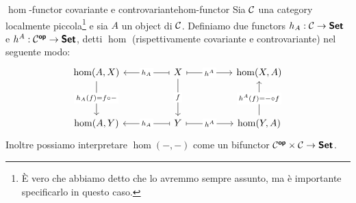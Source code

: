 \documentclass{article}
\renewcommand\C{\mc{C}}
\begin{document}
\begin{definition}{$\hom$-functor covariante e controvariante}{hom-functor}
    Sia $\C$ una category localmente piccola\footnote{È vero che abbiamo detto che lo avremmo sempre assunto, ma è importante specificarlo in questo caso.} e sia $A$ un object di $\C$. Definiamo due functors $h_A:\C\to\setcat$ e $h^A : \C^\op\to\setcat$, detti $\hom$ (rispettivamente covariante e controvariante) nel seguente modo:
        \[\begin{tikzcd}
    	{\hom(A,X)} && X && {\hom(X,A)} \\
    	\\
    	{\hom(A,Y)} && Y && {\hom(Y,A)}
    	\arrow["{h_A(f) = f\circ -}"{description}, from=1-1, to=3-1]
    	\arrow["{h_A}"{description}, maps to, from=1-3, to=1-1]
    	\arrow["{h^A}"{description}, maps to, from=1-3, to=1-5]
    	\arrow["f"{description}, from=1-3, to=3-3]
    	\arrow["{h_A}"{description}, maps to, from=3-3, to=3-1]
    	\arrow["{h^A}"{description}, maps to, from=3-3, to=3-5]
	    \arrow["{h^A(f) = -\circ f}"{description}, from=3-5, to=1-5]
    \end{tikzcd}\]
    Inoltre possiamo interpretare $\hom(-,-)$ come un bifunctor $\C^\op\times \C \to \setcat$.
\end{definition}
\end{document}
